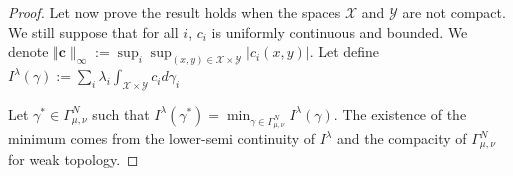 \begin{proof}

\medskip

Let now prove  the result holds when the spaces $\mathcal{X}$ and $\mathcal{Y}$ are not compact. We still suppose that for all $i$, $c_i$ is uniformly continuous and bounded. We denote $\Vert\mathbf{c}\rVert_\infty := \sup_i \sup_{(x,y)\in\mathcal{X}\times\mathcal{Y}} \lvert c_i(x,y)\rvert$. Let define $I^\lambda(\gamma):=\sum_i\lambda_i\int_{\mathcal{X}\times\mathcal{Y}}c_id\gamma_i$

Let $\gamma^*\in \Gamma^N_{\mu,\nu}$ such that $I^\lambda(\gamma^*) =\min_{\gamma\in\Gamma^N_{\mu,\nu}}I^\lambda(\gamma)$.  The existence of the minimum comes from the lower-semi continuity of $I^\lambda$ and  the compacity of $\Gamma^N_{\mu,\nu}$ for weak topology.


\end{proof}
